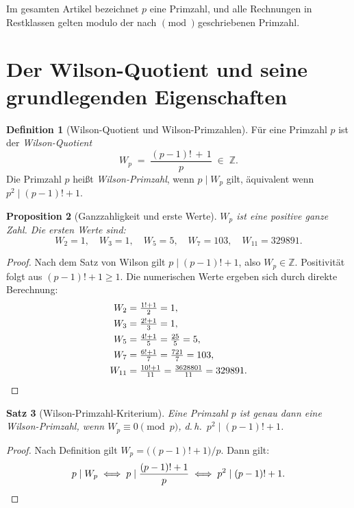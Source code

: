 \documentclass[12pt,a4paper]{amsart}
\newtheorem{theorem}{Satz}[section]
\newtheorem{proposition}[theorem]{Proposition}
\theoremstyle{definition}
\newtheorem{definition}[theorem]{Definition}
\newcommand{\Z}{\mathbb{Z}}
\begin{document}
Im gesamten Artikel bezeichnet $p$ eine Primzahl, und alle Rechnungen in
Restklassen gelten modulo der nach $\pmod{}$ geschriebenen Primzahl.

\section{Der Wilson-Quotient und seine grundlegenden Eigenschaften}

\begin{definition}[Wilson-Quotient und Wilson-Primzahlen]\label{def:wilson_quotient}
  Für eine Primzahl $p$ ist der \emph{Wilson-Quotient}
  \[
    W_p \;=\; \frac{(p-1)!\,+\,1}{p} \;\in\; \Z.
  \]
  Die Primzahl $p$ heißt \emph{Wilson-Primzahl}, wenn $p \mid W_p$ gilt,
  äquivalent wenn $p^2 \mid (p-1)! + 1$.
\end{definition}

\begin{proposition}[Ganzzahligkeit und erste Werte]\label{prop:grundlegendes}
  $W_p$ ist eine positive ganze Zahl. Die ersten Werte sind:
  \[
    W_2 = 1,\quad W_3 = 1,\quad W_5 = 5,\quad W_7 = 103,\quad W_{11} = 329891.
  \]
\end{proposition}

\begin{proof}
  Nach dem Satz von Wilson gilt $p \mid (p-1)! + 1$, also $W_p \in \Z$.
  Positivität folgt aus $(p-1)! + 1 \geq 1$.
  Die numerischen Werte ergeben sich durch direkte Berechnung:
  \begin{align*}
    W_2 &= \tfrac{1!+1}{2} = 1,\\
    W_3 &= \tfrac{2!+1}{3} = 1,\\
    W_5 &= \tfrac{4!+1}{5} = \tfrac{25}{5} = 5,\\
    W_7 &= \tfrac{6!+1}{7} = \tfrac{721}{7} = 103,\\
    W_{11} &= \tfrac{10!+1}{11} = \tfrac{3628801}{11} = 329891.\qedhere
  \end{align*}
\end{proof}

\begin{theorem}[Wilson-Primzahl-Kriterium]\label{satz:wilson_primzahl_kriterium}
  Eine Primzahl $p$ ist genau dann eine Wilson-Primzahl, wenn
  $W_p \equiv 0 \pmod{p}$, d.\,h.\ $p^2 \mid (p-1)! + 1$.
\end{theorem}

\begin{proof}
  Nach Definition gilt $W_p = \bigl((p-1)!+1\bigr)/p$. Dann gilt:
  \[
    p \mid W_p
    \iff p \mid \frac{(p-1)!+1}{p}
    \iff p^2 \mid (p-1)! + 1. \qedhere
  \]
\end{proof}
\end{document}
